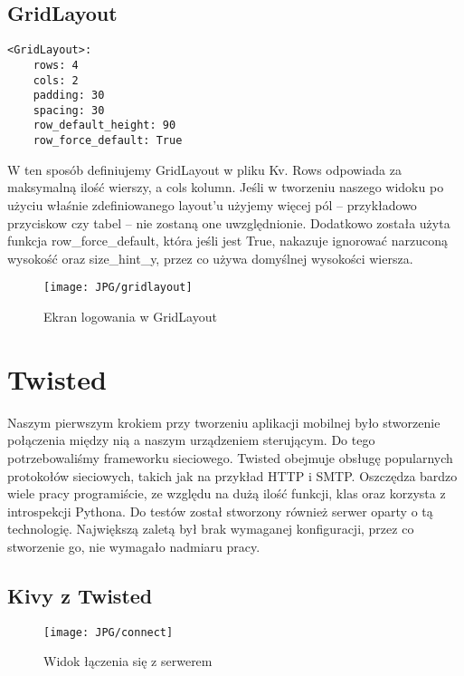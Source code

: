 \documentclass{xmgr}
\begin{document}
\subsection{GridLayout}
\begin{lstlisting} 
<GridLayout>:
    rows: 4
    cols: 2
    padding: 30
    spacing: 30
    row_default_height: 90
    row_force_default: True
\end{lstlisting}
W ten sposób definiujemy GridLayout w pliku Kv. Rows odpowiada za maksymalną ilość wierszy, a cols kolumn. Jeśli w tworzeniu naszego widoku po użyciu właśnie zdefiniowanego layout'u
użyjemy więcej pól -- przykładowo przyciskow czy tabel -- nie zostaną one uwzględnionie. Dodatkowo została użyta funkcja row\_force\_default, która jeśli jest True, nakazuje ignorować narzuconą wysokość oraz size\_hint\_y, przez co używa domyślnej wysokości wiersza.
\newpage
\begin{figure}
\begin{center}
\texttt{[image: JPG/gridlayout]}
\caption{Ekran logowania w GridLayout}
\end{center}
\end{figure}

\section{Twisted}
Naszym pierwszym krokiem przy tworzeniu aplikacji mobilnej było stworzenie połączenia między nią a naszym urządzeniem sterującym. Do tego potrzebowaliśmy frameworku sieciowego. Twisted\cite{Peticolas:2018:twisted} obejmuje obsługę popularnych protokołów sieciowych, takich jak na przykład HTTP i SMTP. Oszczędza bardzo wiele pracy programiście, ze względu na dużą ilość funkcji, klas oraz korzysta z introspekcji Pythona. Do testów został stworzony również serwer oparty o tą technologię. Największą zaletą był brak wymaganej konfiguracji, przez co stworzenie go, nie wymagało nadmiaru pracy.
\newpage
\subsection{Kivy z Twisted}
\begin{figure}
\begin{center}
\texttt{[image: JPG/connect]}
\caption{Widok łączenia się z serwerem}

\end{center}
\end{figure}
\end{document}

